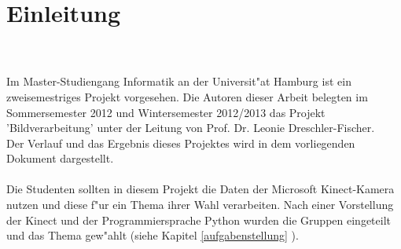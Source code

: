 \chapter{Einleitung}
\label{ch:einleitung}
\\ \\
Im Master-Studiengang Informatik an der Universit"at Hamburg ist ein zweisemestriges Projekt vorgesehen. Die Autoren dieser Arbeit belegten im Sommersemester 2012 und Wintersemester 2012/2013 das Projekt 'Bildverarbeitung' unter der Leitung von Prof. Dr. Leonie Dreschler-Fischer. \\
Der Verlauf und das Ergebnis dieses Projektes wird in dem vorliegenden Dokument dargestellt.
\\ \\
Die Studenten sollten in diesem Projekt die Daten der Microsoft Kinect-Kamera nutzen und diese f"ur ein Thema ihrer Wahl verarbeiten. Nach einer Vorstellung der Kinect und der Programmiersprache Python wurden die Gruppen eingeteilt und das Thema gew"ahlt (siehe Kapitel \ref{aufgabenstellung} ).  \\ \\


